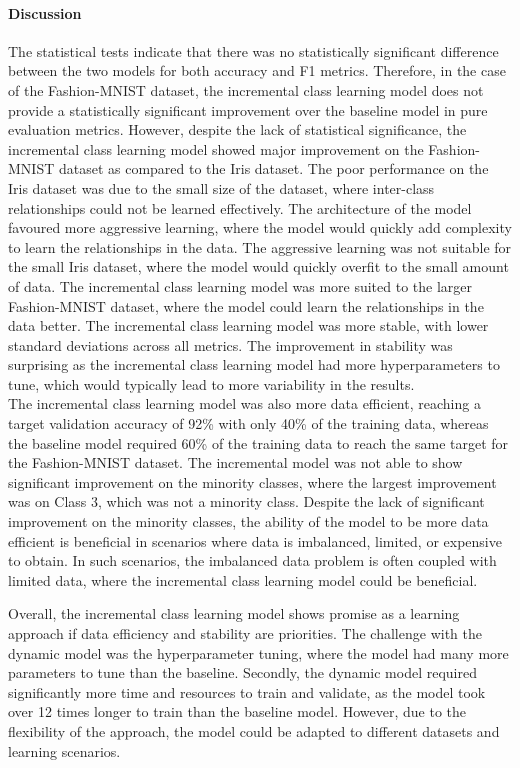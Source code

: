 \documentclass[conference]{IEEEtran}
\begin{document}
  \paragraph{Discussion}
The statistical tests indicate that there was no statistically significant difference between the two models for both accuracy and F1 metrics. Therefore, in the case of the Fashion-MNIST dataset, 
the incremental class learning model does not provide a statistically significant improvement over the baseline model in pure evaluation metrics. However, despite the 
lack of statistical significance, the incremental class learning model showed major improvement on the Fashion-MNIST dataset as compared to the Iris 
dataset. The poor performance on the Iris dataset was due to the small size of the dataset, where inter-class relationships 
could not be learned effectively. The architecture of the model favoured more aggressive learning, where the model would 
quickly add complexity to learn the relationships in the data. The aggressive learning was not suitable for the small Iris 
dataset, where the model would quickly overfit to the small amount of data. The incremental class learning model was more suited to the
 larger Fashion-MNIST dataset, where the model could learn the relationships in the data better. The incremental class learning model was 
 more stable, with lower standard deviations across all metrics. The improvement in stability was surprising as the incremental class learning model had more hyperparameters to tune, which would typically lead to more variability in the results.\\
 
 The incremental class learning model was also more data efficient, reaching 
 a target validation accuracy of 92\% with only 40\% of the training data, whereas the baseline model required 60\% of the training data
 to reach the same target for the Fashion-MNIST dataset. The incremental model was not able to show significant improvement on the minority 
 classes, where the largest improvement was on Class 3, which was not a minority class. Despite the lack of significant improvement on the 
 minority classes, the ability of the model to be more data efficient is beneficial in scenarios where data is imbalanced, limited, or expensive to obtain.
 In such scenarios, the imbalanced data problem is often coupled with limited data, where the incremental class learning model could be beneficial.

 Overall, the incremental class learning model shows promise as a learning approach if data efficiency and stability are priorities. The challenge 
 with the dynamic model was the hyperparameter tuning, where the model had many more parameters to tune than the baseline. Secondly, the dynamic model required 
 significantly more time and resources to train and validate, as the model took over 12 times longer to train than the baseline model. However, due to the flexibility of the approach, 
 the model could be adapted to different datasets and learning scenarios. 
\end{document}

